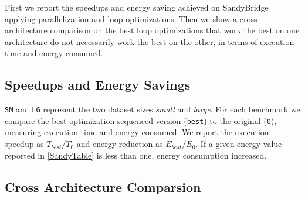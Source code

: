 First we report the speedups and energy saving achieved on SandyBridge applying parallelization and
loop optimizations. Then we show a cross-architecture comparison on the best loop optimizations that work the best on one architecture do not necessarily work the best on the other, in terms of execution time and energy consumed.
\subsection{Speedups and Energy Savings}

\begin{table}[!ht]
  \label{SandyTable}
\end{table}

\texttt{SM} and \texttt{LG} represent the two dataset sizes \textit{small} and \textit{large}.
For each benchmark we compare the best optimization sequenced version (\texttt{best}) to
the original (\texttt{0}), measuring execution time and energy consumed. We report the
execution speedup as $T_{best}/T_0$ and energy reduction as $E_{best}/E_0$.
If a given energy value reported in \ref{SandyTable} is less than one, energy consumption increased.

\subsection{Cross Architecture Comparsion}

